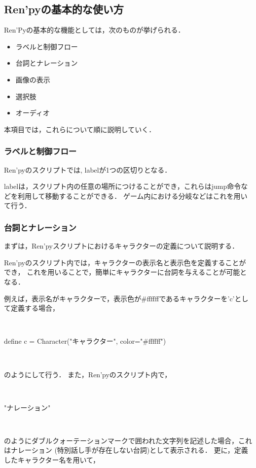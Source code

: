 \subsection{Ren'pyの基本的な使い方}

  Ren'Pyの基本的な機能としては，次のものが挙げられる．

  \begin{itemize}
    \item ラベルと制御フロー
    \item 台詞とナレーション
    \item 画像の表示
    \item 選択肢
    \item オーディオ
  \end{itemize}

  本項目では，これらについて順に説明していく．

  \subsubsection{ラベルと制御フロー}

    Ren'pyのスクリプトでは, labelが1つの区切りとなる．
    
    labelは，スクリプト内の任意の場所につけることができ，これらはjump命令などを利用して移動することができる．
    ゲーム内における分岐などはこれを用いて行う．

  \subsubsection{台詞とナレーション}

    まずは，Ren'pyスクリプトにおけるキャラクターの定義について説明する．

    Ren'pyのスクリプト内では，キャラクターの表示名と表示色を定義することができ，
    これを用いることで，簡単にキャラクターに台詞を与えることが可能となる．

    例えば，表示名がキャラクターで，表示色が\#ffffffであるキャラクターを'c'として定義する場合，

    ~

    define c = Character("キャラクター", color="\#ffffff")

    ~

    のようにして行う．
    また，Ren'pyのスクリプト内で，

    ~

    "ナレーション"

    ~

    のようにダブルクォーテーションマークで囲われた文字列を記述した場合，これはナレーション
    (特別話し手が存在しない台詞)として表示される．
    更に，定義したキャラクター名を用いて，

